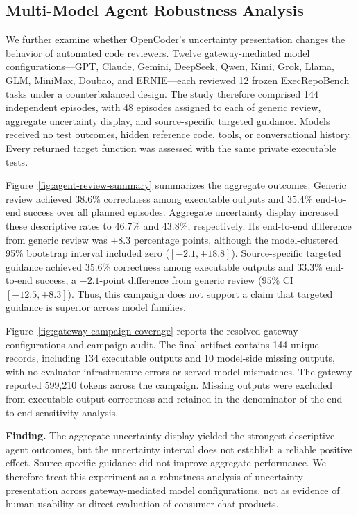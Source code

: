 \subsection{Multi-Model Agent Robustness Analysis}
\label{sec:multi-model-agent-analysis}

We further examine whether OpenCoder's uncertainty presentation changes the
behavior of automated code reviewers. Twelve gateway-mediated model
configurations---GPT, Claude, Gemini, DeepSeek, Qwen, Kimi, Grok, Llama, GLM,
MiniMax, Doubao, and ERNIE---each reviewed 12 frozen ExecRepoBench tasks under
a counterbalanced design. The study therefore comprised 144 independent
episodes, with 48 episodes assigned to each of generic review, aggregate
uncertainty display, and source-specific targeted guidance. Models received no
test outcomes, hidden reference code, tools, or conversational history. Every
returned target function was assessed with the same private executable tests.

Figure~\ref{fig:agent-review-summary} summarizes the aggregate outcomes. Generic
review achieved 38.6\% correctness among executable outputs and 35.4\%
end-to-end success over all planned episodes. Aggregate uncertainty display
increased these descriptive rates to 46.7\% and 43.8\%, respectively. Its
end-to-end difference from generic review was +8.3 percentage points, although
the model-clustered 95\% bootstrap interval included zero
($[-2.1,+18.8]$). Source-specific targeted guidance achieved 35.6\%
correctness among executable outputs and 33.3\% end-to-end success, a
$-2.1$-point difference from generic review ($95\%$ CI
$[-12.5,+8.3]$). Thus, this campaign does not support a claim that targeted
guidance is superior across model families.

Figure~\ref{fig:gateway-campaign-coverage} reports the resolved gateway
configurations and campaign audit. The final artifact contains 144 unique
records, including 134 executable outputs and 10 model-side missing outputs,
with no evaluator infrastructure errors or served-model mismatches. The
gateway reported 599,210 tokens across the campaign. Missing outputs were
excluded from executable-output correctness and retained in the denominator of
the end-to-end sensitivity analysis.

\noindent\textbf{Finding.}
The aggregate uncertainty display yielded the strongest descriptive agent
outcomes, but the uncertainty interval does not establish a reliable positive
effect. Source-specific guidance did not improve aggregate performance. We
therefore treat this experiment as a robustness analysis of uncertainty
presentation across gateway-mediated model configurations, not as evidence of
human usability or direct evaluation of consumer chat products.

